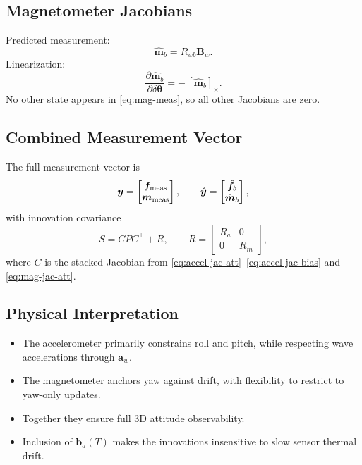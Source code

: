\documentclass[10pt]{extarticle}
\begin{document}
\subsection{Magnetometer Jacobians}
Predicted measurement:
\[
\hat{\bm m}_b = R_{wb}\bm B_w.
\]
Linearization:
\begin{equation}
\frac{\partial \hat{\bm m}_b}{\partial \delta\bm\theta} = -\,[\hat{\bm m}_b]_\times.
\label{eq:mag-jac-att}
\end{equation}
No other state appears in \eqref{eq:mag-meas}, so all other Jacobians are zero.

\subsection{Combined Measurement Vector}
The full measurement vector is
\[
\bm y = \begin{bmatrix}\bm f_{\rm meas}\\ \bm m_{\rm meas}\end{bmatrix},
\qquad
\hat{\bm y} = \begin{bmatrix}\hat{\bm f}_b\\ \hat{\bm m}_b\end{bmatrix},
\]
with innovation covariance
\begin{equation}
S = C P C^\top + R,
\qquad
R = \begin{bmatrix} R_a & 0 \\ 0 & R_m \end{bmatrix},
\label{eq:meas-cov}
\end{equation}
where $C$ is the stacked Jacobian from \eqref{eq:accel-jac-att}--\eqref{eq:accel-jac-bias} and \eqref{eq:mag-jac-att}.

\subsection{Physical Interpretation}
\begin{itemize}
\item The accelerometer primarily constrains roll and pitch, while respecting wave accelerations
through $\bm a_w$.
\item The magnetometer anchors yaw against drift, with flexibility to restrict to yaw-only updates.
\item Together they ensure full 3D attitude observability.
\item Inclusion of $\bm b_a(T)$ makes the innovations insensitive to slow sensor thermal drift.
\end{itemize}
\end{document}
